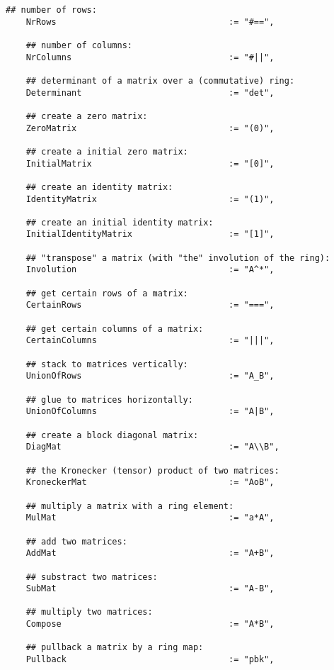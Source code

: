 \documentclass[a4paper,11pt]{report}
\begin{document}
{{{\begin{Verbatim}[fontsize=\small,frame=single,label=Code]
    ## number of rows:
    NrRows                                  := "#==",
    
    ## number of columns:
    NrColumns                               := "#||",
    
    ## determinant of a matrix over a (commutative) ring:
    Determinant                             := "det",
    
    ## create a zero matrix:
    ZeroMatrix                              := "(0)",
    
    ## create a initial zero matrix:
    InitialMatrix                           := "[0]",
    
    ## create an identity matrix:
    IdentityMatrix                          := "(1)",
    
    ## create an initial identity matrix:
    InitialIdentityMatrix                   := "[1]",
    
    ## "transpose" a matrix (with "the" involution of the ring):
    Involution                              := "A^*",
    
    ## get certain rows of a matrix:
    CertainRows                             := "===",
    
    ## get certain columns of a matrix:
    CertainColumns                          := "|||",
    
    ## stack to matrices vertically:
    UnionOfRows                             := "A_B",
    
    ## glue to matrices horizontally:
    UnionOfColumns                          := "A|B",
    
    ## create a block diagonal matrix:
    DiagMat                                 := "A\\B",
    
    ## the Kronecker (tensor) product of two matrices:
    KroneckerMat                            := "AoB",
    
    ## multiply a matrix with a ring element:
    MulMat                                  := "a*A",
    
    ## add two matrices:
    AddMat                                  := "A+B",
    
    ## substract two matrices:
    SubMat                                  := "A-B",
    
    ## multiply two matrices:
    Compose                                 := "A*B",
    
    ## pullback a matrix by a ring map:
    Pullback                                := "pbk",
    

\end{Verbatim}}}}
\end{document}
